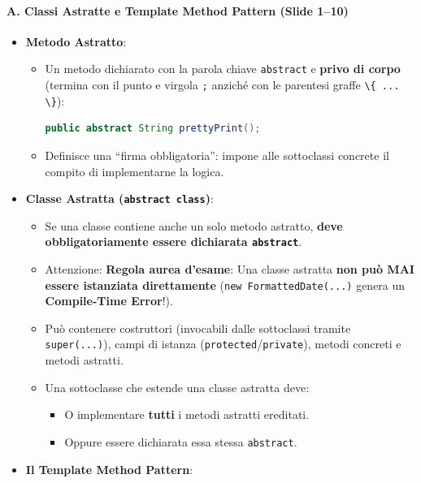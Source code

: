\documentclass[11pt,a4paper]{article}
\newcommand{\passthrough}[1]{#1}
\providecommand{\tightlist}{\setlength{\itemsep}{0pt}\setlength{\parskip}{0pt}}
\begin{document}
\paragraph{A. Classi Astratte e Template Method Pattern (Slide
1--10)}\label{a.-classi-astratte-e-template-method-pattern-slide-110}

\begin{itemize}
\tightlist
\item
  \textbf{Metodo Astratto}:

  \begin{itemize}
  \item
    Un metodo dichiarato con la parola chiave
    \passthrough{\lstinline!abstract!} e \textbf{privo di corpo}
    (termina con il punto e virgola \passthrough{\lstinline!;!} anziché
    con le parentesi graffe \passthrough{\lstinline!\{ ... \}!}):

\begin{lstlisting}[language=Java]
public abstract String prettyPrint();
\end{lstlisting}
  \item
    Definisce una ``firma obbligatoria'': impone alle sottoclassi
    concrete il compito di implementarne la logica.
  \end{itemize}
\item
  \textbf{Classe Astratta (\passthrough{\lstinline!abstract class!})}:

  \begin{itemize}
  \tightlist
  \item
    Se una classe contiene anche un solo metodo astratto, \textbf{deve
    obbligatoriamente essere dichiarata
    \passthrough{\lstinline!abstract!}}.
  \item
    Attenzione: \textbf{Regola aurea d'esame}: Una classe astratta
    \textbf{non può MAI essere istanziata direttamente}
    (\passthrough{\lstinline!new FormattedDate(...)!} genera un
    \textbf{Compile-Time Error}!).
  \item
    Può contenere costruttori (invocabili dalle sottoclassi tramite
    \passthrough{\lstinline!super(...)!}), campi di istanza
    (\passthrough{\lstinline!protected!}/\passthrough{\lstinline!private!}),
    metodi concreti e metodi astratti.
  \item
    Una sottoclasse che estende una classe astratta deve:

    \begin{itemize}
    \tightlist
    \item
      O implementare \textbf{tutti} i metodi astratti ereditati.
    \item
      Oppure essere dichiarata essa stessa
      \passthrough{\lstinline!abstract!}.
    \end{itemize}
  \end{itemize}
\item
  \textbf{Il Template Method Pattern}:


\end{itemize}
\end{document}
